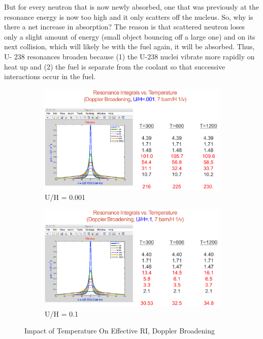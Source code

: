 \documentclass{school-22.211-notes}
\begin{document}
But for every neutron that is now newly absorbed, one that was previously at the
resonance energy is now too high and it only scatters off the nucleus. So, why is
there a net increase in absorption? The reason is that scattered neutron loses only
a slight amount of energy (small object bouncing off a large one) and on its next
collision, which will likely be with the fuel again, it will be absorbed. Thus, U-
238 resonances broaden because (1) the U-238 nuclei vibrate more rapidly on heat
up and (2) the fuel is separate from the coolant so that successive interactions
occur in the fuel.

\begin{figure}
  \begin{subfigure}[b]{0.45\textwidth}
    \centering
    \includegraphics[width=\textwidth]{images/r-m/Doppler-RI-1.png}
    \caption{U/H = 0.001} \label{UH0.01}
  \end{subfigure}
  \begin{subfigure}[b]{0.45\textwidth}
    \centering
    \includegraphics[width=\textwidth]{images/r-m/Doppler-RI-2.png}
    \caption{U/H = 0.1} \label{UH0.1}
  \end{subfigure}
  \caption{Impact of Temperature On Effective RI, Doppler Broadening} \label{Doppler}
\end{figure}
\end{document}
